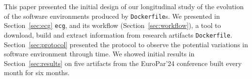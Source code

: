 \documentclass[sigconf,natbib=false]{acmart}
\newcommand{\ie}{\emph{i.e.,}}
\newcommand{\df}{\texttt{Dockerfile}}
\newcommand{\ecg}{\texttt{ecg}}
\begin{document}
% 
% 
% 
% 
% 
% 


This paper presented the initial design of our longitudinal study of the evolution of the software environments produced by \df s.
We presented in Section~\ref{sec:ecg} \ecg, and its workflow (Section~\ref{sec:workflow}), a tool to download, build and extract information from research artifacts \df.
Section~\ref{sec:protocol} presented the protocol to observe the potential variations in software environment through time.
We showed initial results in Section~\ref{sec:results} on five artifacts from the EuroPar'24 conference built every month for six months.
\end{document}
